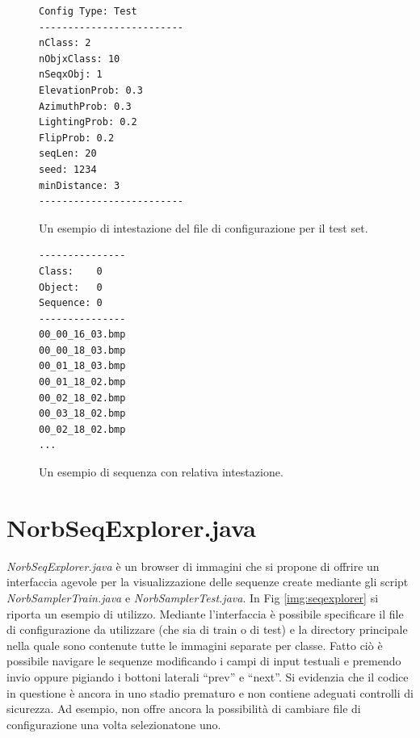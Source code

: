 \documentclass[paper=a4, fontsize=11pt]{scrartcl} %
\numberwithin{equation}{section} %
\numberwithin{figure}{section} %
\numberwithin{table}{section} %
\begin{document}
\begin{figure}[H]
\label{img:testheader}
\centering
\begin{BVerbatim}
Config Type: Test
-------------------------
nClass: 2
nObjxClass: 10
nSeqxObj: 1
ElevationProb: 0.3
AzimuthProb: 0.3
LightingProb: 0.2
FlipProb: 0.2
seqLen: 20
seed: 1234
minDistance: 3
-------------------------
\end{BVerbatim}
\caption{Un esempio di intestazione del file di configurazione per il test set.}
\end{figure}

\begin{figure}[H]
\label{img:seqheaderTest}
\centering
\begin{BVerbatim}
---------------
Class:    0
Object:   0
Sequence: 0
---------------
00_00_16_03.bmp
00_00_18_03.bmp
00_01_18_03.bmp
00_01_18_02.bmp
00_02_18_02.bmp
00_03_18_02.bmp
00_02_18_02.bmp
...
\end{BVerbatim}
\caption{Un esempio di sequenza con relativa intestazione.}
\end{figure}

\section{NorbSeqExplorer.java}
\emph{NorbSeqExplorer.java} è un browser di immagini che si propone  di offrire un interfaccia agevole per la visualizzazione delle sequenze create mediante gli script \emph{NorbSamplerTrain.java} e \emph{NorbSamplerTest.java}. In Fig \ref{img:seqexplorer} si riporta un esempio di utilizzo. Mediante l'interfaccia è possibile specificare il file di configurazione da utilizzare (che sia di train o di test) e la directory principale nella quale sono contenute tutte le immagini separate per classe. Fatto ciò è possibile navigare le sequenze modificando i campi di input testuali e premendo invio oppure pigiando i bottoni laterali ``prev'' e ``next''. Si evidenzia che il codice in questione è ancora in uno stadio prematuro e non contiene adeguati controlli di sicurezza. Ad esempio, non offre ancora la possibilità di cambiare file di configurazione una volta selezionatone uno.
\end{document}
